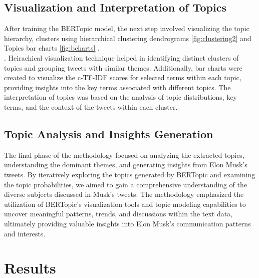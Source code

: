 \documentclass[12pt]{article}
\begin{document}
\subsection{Visualization and Interpretation of Topics}
    After training the BERTopic model, the next step involved visualizing the topic hierarchy,  clusters using hierarchical clustering dendrograms  \ref{fig:clustering2} and Topics  bar  charts  \ref{fig:bcharts} . \\. Heirachical visualization technique helped in identifying distinct clusters of topics and grouping tweets with similar themes. Additionally, bar charts were created to visualize the c-TF-IDF scores for selected terms within each topic, providing insights into the key terms associated with different topics. The interpretation of topics was based on the analysis of topic distributions, key terms, and the context of the tweets within each cluster.
\newpage
\subsection{Topic Analysis and Insights Generation}
    The final phase of the methodology focused on analyzing the extracted topics, understanding the dominant themes, and generating insights from Elon Musk's tweets. By iteratively exploring the topics generated by BERTopic and examining the topic probabilities, we aimed to gain a comprehensive understanding of the diverse subjects discussed in Musk's tweets. The methodology emphasized the utilization of BERTopic's visualization tools and topic modeling capabilities to uncover meaningful patterns, trends, and discussions within the text data, ultimately providing valuable insights into Elon Musk's communication patterns and interests.
\section{Results}
\end{document}
